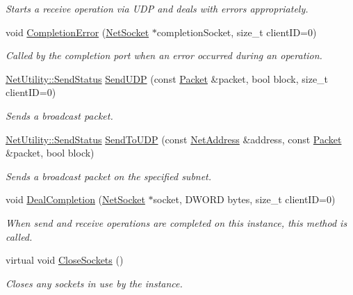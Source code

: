 \begin{DoxyCompactItemize}
\begin{DoxyCompactList}\small\item\em Starts a receive operation via UDP and deals with errors appropriately. \item\end{DoxyCompactList}\item 
void \hyperlink{class_net_instance_broadcast_ab5a92372b16809e63d5842e20997468d}{CompletionError} (\hyperlink{class_net_socket}{NetSocket} $\ast$completionSocket, size\_\-t clientID=0)
\begin{DoxyCompactList}\small\item\em Called by the completion port when an error occurred during an operation. \item\end{DoxyCompactList}\item 
\hyperlink{class_net_utility_a8051eca61204ffd818281419bbf44736}{NetUtility::SendStatus} \hyperlink{class_net_instance_broadcast_ae4bb850a1b3d0743d14c8c4ff3414d4a}{SendUDP} (const \hyperlink{class_packet}{Packet} \&packet, bool block, size\_\-t clientID=0)
\begin{DoxyCompactList}\small\item\em Sends a broadcast packet. \item\end{DoxyCompactList}\item 
\hyperlink{class_net_utility_a8051eca61204ffd818281419bbf44736}{NetUtility::SendStatus} \hyperlink{class_net_instance_broadcast_a80e22350fe35b5660cf1402de0d9b556}{SendToUDP} (const \hyperlink{class_net_address}{NetAddress} \&address, const \hyperlink{class_packet}{Packet} \&packet, bool block)
\begin{DoxyCompactList}\small\item\em Sends a broadcast packet on the specified subnet. \item\end{DoxyCompactList}\item 
void \hyperlink{class_net_instance_broadcast_a9f0b6f8c6ccf8a452a0e7942e7d037fe}{DealCompletion} (\hyperlink{class_net_socket}{NetSocket} $\ast$socket, DWORD bytes, size\_\-t clientID=0)
\begin{DoxyCompactList}\small\item\em When send and receive operations are completed on this instance, this method is called. \item\end{DoxyCompactList}\item 
virtual void \hyperlink{class_net_instance_broadcast_a57d4cf5253f4aba9d91003eb8fb0a598}{CloseSockets} ()
\begin{DoxyCompactList}\small\item\em Closes any sockets in use by the instance. \item\end{DoxyCompactList}\end{DoxyCompactItemize}
